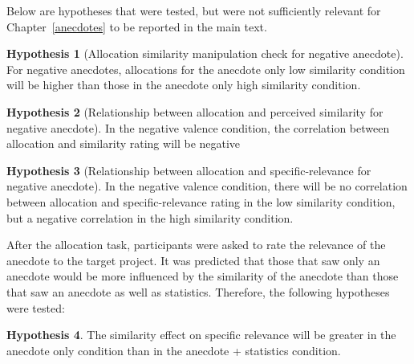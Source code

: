 \documentclass[a4paper, nobind, dvipsnames]{templates/ociamthesis}
\theoremstyle{definition}
\theoremstyle{definition}
\theoremstyle{definition}
\theoremstyle{definition}
\newtheorem{hypothesis}{Hypothesis}[chapter]
\theoremstyle{remark}
\begin{document}
Below are hypotheses that were tested, but were not sufficiently relevant for
Chapter~\ref{anecdotes} to be reported in the main text.

\begin{hypothesis}[Allocation similarity manipulation check for negative anecdote]
\protect\hypertarget{hyp:similarity-check-anecdotes-1}{}{\label{hyp:similarity-check-anecdotes-1} {} }For negative anecdotes, allocations for the anecdote only low similarity
condition will be higher than those in the anecdote only high similarity
condition.
\end{hypothesis}

\begin{hypothesis}[Relationship between allocation and perceived similarity for negative anecdote]
\protect\hypertarget{hyp:allocation-similarity-anecdotes-1}{}{\label{hyp:allocation-similarity-anecdotes-1} {} }In the negative valence condition, the correlation between allocation and
similarity rating will be negative
\end{hypothesis}

\begin{hypothesis}[Relationship between allocation and specific-relevance for negative anecdote]
\protect\hypertarget{hyp:allocation-specific-relevance-anecdotes-1}{}{\label{hyp:allocation-specific-relevance-anecdotes-1} {} }In the negative valence condition, there will be no correlation between
allocation and specific-relevance rating in the low similarity condition, but a
negative correlation in the high similarity condition.
\end{hypothesis}

After the allocation task, participants were asked to rate the relevance of the
anecdote to the target project. It was predicted that those that saw only an
anecdote would be more influenced by the similarity of the anecdote than those
that saw an anecdote as well as statistics. Therefore, the following hypotheses
were tested:

\begin{hypothesis}
\protect\hypertarget{hyp:relevance-specific-anecdotes-1}{}{\label{hyp:relevance-specific-anecdotes-1} }The similarity effect on specific relevance will be greater in the anecdote only
condition than in the anecdote + statistics condition.
\end{hypothesis}
\end{document}
